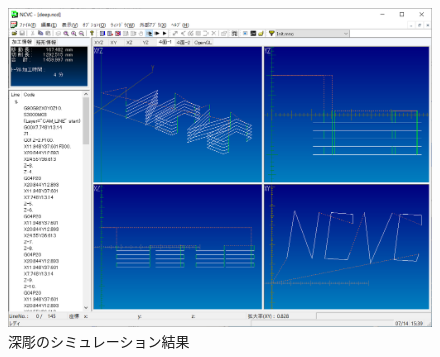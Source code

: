 \begin{figure}[H]
\centering
\includegraphics[scale=0.55]{No3/fig/deep.png}
\caption{深彫のシミュレーション結果}
\label{fig:deep.png}
\end{figure}

